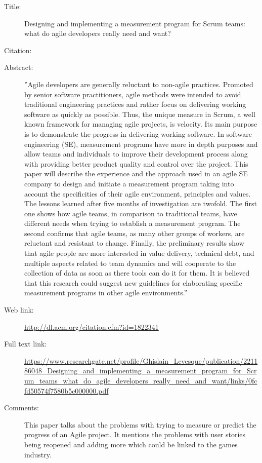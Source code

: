 \documentclass{scrartcl}
\begin{document}
\begin{description}
	\item[Title:] Designing and implementing a measurement program for Scrum teams: what do agile developers really need and want?
	\item[Citation:] \cite{Ktata}
	\item[Abstract:] ''Agile developers are generally reluctant to non-agile practices. Promoted by senior software practitioners, agile methods were intended to avoid traditional engineering practices and rather focus on delivering working software as quickly as possible. Thus, the unique measure in Scrum, a well known framework for managing agile projects, is velocity. Its main purpose is to demonstrate the progress in delivering working software. In software engineering (SE), measurement programs have more in depth purposes and allow teams and individuals to improve their development process along with providing better product quality and control over the project. This paper will describe the experience and the approach used in an agile SE company to design and initiate a measurement program taking into account the specificities of their agile environment, principles and values. The lessons learned after five months of investigation are twofold. The first one shows how agile teams, in comparison to traditional teams, have different needs when trying to establish a measurement program. The second confirms that agile teams, as many other groups of workers, are reluctant and resistant to change. Finally, the preliminary results show that agile people are more interested in value delivery, technical debt, and multiple aspects related to team dynamics and will cooperate to the collection of data as soon as there tools can do it for them. It is believed that this research could suggest new guidelines for elaborating specific measurement programs in other agile environments.''
	\item[Web link:] \url{http://dl.acm.org/citation.cfm?id=1822341}
	\item[Full text link:] \url{https://www.researchgate.net/profile/Ghislain_Levesque/publication/221186048_Designing_and_implementing_a_measurement_program_for_Scrum_teams_what_do_agile_developers_really_need_and_want/links/0fcfd50574f7580b5c000000.pdf}
	\item[Comments:] This paper talks about the problems with trying to measure or predict the progress of an Agile project. It mentions the problems with user stories being reopened and adding more which could be linked to the games industry. 
\end{description}
\end{document}
